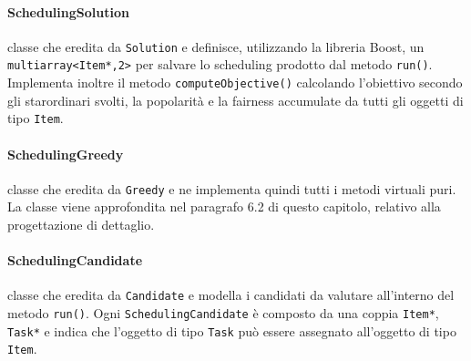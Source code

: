 \paragraph{SchedulingSolution} classe che eredita da \texttt{Solution} e definisce, utilizzando la libreria Boost, un \texttt{multi\textunderscore array<Item*,2>} per salvare lo scheduling prodotto dal metodo \texttt{run()}. Implementa inoltre il metodo \texttt{computeObjective()} calcolando l'obiettivo secondo gli starordinari svolti, la popolarità e la fairness accumulate da tutti gli oggetti di tipo \texttt{Item}.
\paragraph{SchedulingGreedy} classe che eredita da \texttt{Greedy} e ne implementa quindi tutti i metodi virtuali puri. La classe viene approfondita nel paragrafo 6.2 di questo capitolo, relativo alla progettazione di dettaglio.
\paragraph{SchedulingCandidate} classe che eredita da \texttt{Candidate} e modella i candidati da valutare all'interno del metodo \texttt{run()}. Ogni \texttt{SchedulingCandidate} è composto da una coppia \texttt{Item*}, \texttt{Task*} e indica che l'oggetto di tipo \texttt{Task} può essere assegnato all'oggetto di tipo \texttt{Item}.
